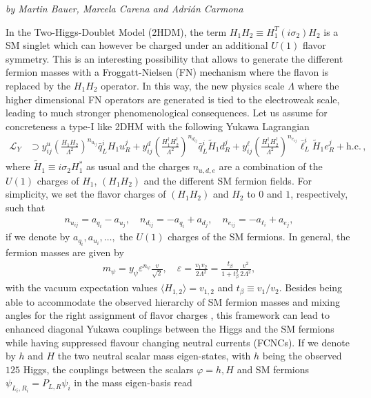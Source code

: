 \begin{center}
\textit{by Martin Bauer, Marcela Carena and Adri\'an Carmona}
\end{center}

In the Two-Higgs-Doublet Model (2HDM), the term $H_1 H_2\equiv H_1^T (i\sigma_2) H_2 $ is a SM singlet which can however be charged under an additional $U(1)$ flavor symmetry. This is an interesting possibility that allows to generate the different fermion masses with a Froggatt-Nielsen (FN) mechanism where the flavon is replaced by the $H_1 H_2$ operator. In this way, the new physics scale $\Lambda$ where the higher dimensional FN operators are generated is tied to the electroweak scale, leading to much stronger phenomenological consequences. Let us assume for concreteness a type-I like 2DHM with the following Yukawa Lagrangian 
\begin{align}
\label{eq:yuk1}
\mathcal{L}_Y&\supset  y^u_{ij} \left(\frac{H_1 H_2}{\Lambda^2}\right)^{n_{u_{ij}}}\bar{q}_L^{i}H_1 u_{R}^j+y^d_{ij} \left(\frac{H_1^{\dagger} H_2^{\dagger}}{\Lambda^2}\right)^{n_{d_{ij}}}\bar{q}_L^{i}\tilde{H}_1 d_{R}^j+y_{ij}^{\ell}\left(\frac{H_1^{\dagger}H_2^{\dagger}}{\Lambda^2}\right)^{n_{e_{ij}}}\bar{\ell}_{L}^i\tilde{H}_1 e_R^j
+\mathrm{h.c.}\,,
\end{align}
where $\tilde{H}_1\equiv i\sigma_2 H^{\ast}_1$ as usual and the charges $n_{u,d,e}$ are a combination of the $U(1)$ charges of $H_1$, $(H_1H_2)$ and the different SM fermion fields. For simplicity, we set the flavor charges of $(H_1 H_2)$ and $H_2$ to $0$ and $1$, respectively, such that  
\begin{align}
n_{u_{ij}}=a_{q_i}-a_{u_j},\quad n_{d_{ij}}=-a_{q_i}+a_{d_j},\quad n_{e_{ij}}=-a_{\ell_i}+a_{e_j},
\end{align}
if we denote by $a_{q_i},a_{u_i}, \ldots,$ the $U(1)$ charges of the SM fermions. In general, the fermion masses are given by
\begin{align}\label{eq:epsilon}
m_\psi=y_{\psi} \varepsilon^{n_\psi} \frac{v}{\sqrt{2}}, \quad \varepsilon = \frac{v_1 v_2}{2\Lambda^2}=\frac{t_\beta}{1+t_\beta^2}\frac{v^2}{2\Lambda^2},
\end{align}
with the vacuum expectation values $\langle H_{1, 2}\rangle=v_{1, 2}$ and $t_\beta \equiv v_1/v_2$. Besides being able to accommodate the observed hierarchy of SM fermion masses and mixing angles for the right assignment of flavor charges \cite{Bauer:2015fxa, Bauer:2015kzy}, this framework can lead to enhanced diagonal Yukawa couplings between the Higgs and the SM fermions while having suppressed flavour changing neutral currents (FCNCs). If we denote by $h$ and $H$ the two neutral scalar mass eigen-states, with $h$ being the observed $125$ \UGeV Higgs, the couplings between the scalars $\varphi=h,H$ and SM fermions $\psi_{L_i, R_i}= P_{L,R} \psi_i$ in the mass eigen-basis read 
